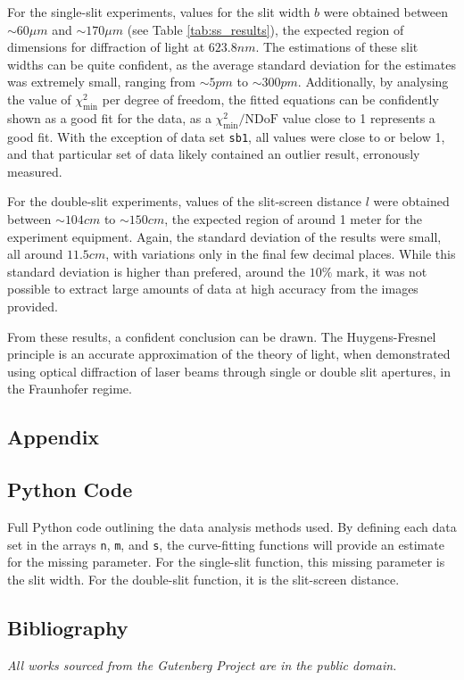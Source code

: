 \documentclass[a4paper]{article}
\begin{document}
For the single-slit experiments, values for the slit width $b$ were obtained between $\sim60 \mu m$ and $\sim170\mu m$ (see Table \ref{tab:ss_results}), the expected region of dimensions for diffraction of light at $623.8nm$. The estimations of these slit widths can be quite confident, as the average standard deviation for the estimates was extremely small, ranging from $\sim 5pm$ to $\sim300pm$. Additionally, by analysing the value of $\chi^2_{\text{min}}$ per degree of freedom, the fitted equations can be confidently shown as a good fit for the data, as a $\chi^2_{\text{min}}/\text{NDoF}$ value close to 1 represents a good fit. With the exception of data set \lstinline$sb1$, all values were close to or below 1, and that particular set of data likely contained an outlier result, erronously measured. 

For the double-slit experiments, values of the slit-screen distance $l$ were obtained between $\sim104cm$ to $\sim150cm$, the expected region of around 1 meter for the experiment equipment. Again, the standard deviation of the results were small, all around $11.5cm$, with variations only in the final few decimal places. While this standard deviation is higher than prefered, around the $10\%$ mark, it was not possible to extract large amounts of data at high accuracy from the images provided.

From these results, a confident conclusion can be drawn. The Huygens-Fresnel principle is an accurate approximation of the theory of light, when demonstrated using optical diffraction of laser beams through single or double slit apertures, in the Fraunhofer regime.

\newpage
\begin{appendix}
\section{Appendix}
\subsection{Python Code}\label{sec:python}

Full Python code outlining the data analysis methods used. By defining each data set in the arrays \lstinline$n$, \lstinline$m$, and \lstinline$s$, the curve-fitting functions will provide an estimate for the missing parameter. For the single-slit function, this missing parameter is the slit width. For the double-slit function, it is the slit-screen distance. 
\clearpage
\subsection{Bibliography}
\emph{All works sourced from the Gutenberg Project are in the public domain.}




\end{appendix}
\end{document}
